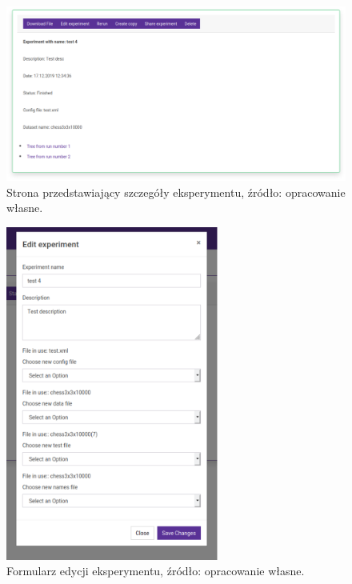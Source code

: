 \begin{figure}[htb]
	\centering
	\includegraphics[width=15cm]{grafika/details_page.eps}
	\caption{Strona przedstawiający szczegóły eksperymentu, źródło: opracowanie własne.}
	\label{rys12_details_page}
\end{figure}

\begin{figure}[htb]
	\centering
	\includegraphics[height=11cm]{grafika/edit_experiment.eps}
	\caption{Formularz edycji eksperymentu, źródło: opracowanie własne.}
	\label{rys13_edit_experiment}
\end{figure}

